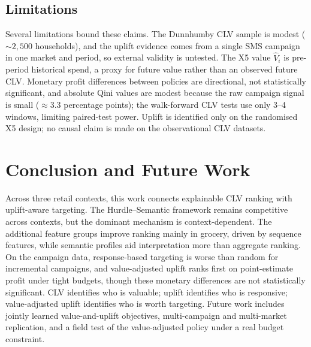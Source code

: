 \documentclass[pdflatex,sn-mathphys-num]{sn-jnl}
\theoremstyle{thmstyleone}
\theoremstyle{thmstylethree}
\begin{document}
\subsection{Limitations}\label{sec:limits}
Several limitations bound these claims. The Dunnhumby CLV sample is modest ($\sim 2{,}500$
households), and the uplift evidence comes from a single SMS campaign in one market and period, so
external validity is untested. The X5 value $\hat V_i$ is pre-period historical spend, a proxy for
future value rather than an observed future CLV. Monetary profit differences between policies
are directional, not statistically significant, and absolute Qini values are modest because the raw
campaign signal is small ($\approx 3.3$ percentage points); the walk-forward CLV tests use only
3--4 windows, limiting paired-test power. Uplift is identified only on the randomised X5 design; no
causal claim is made on the observational CLV datasets.

\section{Conclusion and Future Work}\label{sec:conclusion}
Across three retail contexts, this work connects explainable CLV ranking with uplift-aware targeting. The
Hurdle--Semantic framework remains competitive across contexts, but the dominant mechanism is
context-dependent. The additional feature groups improve ranking mainly in grocery, driven by
sequence features, while semantic profiles aid interpretation more than aggregate ranking. On the
campaign data, response-based targeting is worse than random for incremental campaigns, and
value-adjusted uplift ranks first on point-estimate profit under tight budgets, though these
monetary differences are not statistically significant. CLV identifies who is valuable; uplift identifies who is responsive;
value-adjusted uplift identifies who is worth targeting. Future work includes jointly learned value-and-uplift objectives, multi-campaign and multi-market replication, and a field test of the value-adjusted policy under a real budget constraint.


\end{document}
